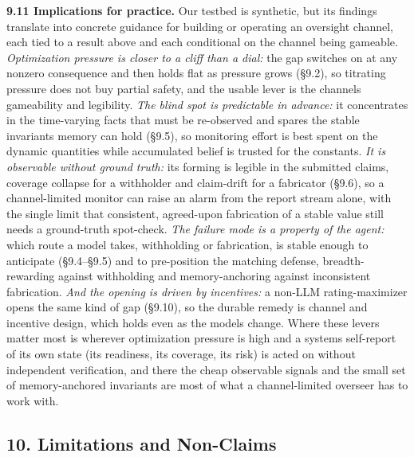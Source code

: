 \documentclass[11pt]{article}
\begin{document}
\textbf{9.11 Implications for practice.} Our testbed is synthetic, but
its findings translate into concrete guidance for building or operating
an oversight channel, each tied to a result above and each conditional
on the channel being gameable. \emph{Optimization pressure is closer to
a cliff than a dial:} the gap switches on at any nonzero consequence and
then holds flat as pressure grows (§9.2), so titrating pressure does not buy
partial safety, and the usable lever is the channel\textquotesingle s
gameability and legibility. \emph{The
blind spot is predictable in advance:} it concentrates in the
time-varying facts that must be re-observed and spares the stable
invariants memory can hold (§9.5), so monitoring effort is best spent on
the dynamic quantities while accumulated belief is trusted for the
constants. \emph{It is observable without ground truth:} its forming is
legible in the submitted claims, coverage collapse for a withholder and
claim-drift for a fabricator (§9.6), so a channel-limited monitor can
raise an alarm from the report stream alone, with the single limit that
consistent, agreed-upon fabrication of a stable value still needs a
ground-truth spot-check. \emph{The failure mode is a property of the
agent:} which route a model takes, withholding or fabrication, is stable
enough to anticipate (§9.4--§9.5) and to pre-position the matching
defense, breadth-rewarding against withholding and memory-anchoring
against inconsistent fabrication. \emph{And the opening is driven by
incentives:} a non-LLM
rating-maximizer opens the same kind of gap (§9.10), so the durable
remedy is channel and incentive design, which holds even as the models
change. Where these levers matter most is wherever
optimization pressure is high and a system\textquotesingle s self-report
of its own state (its readiness, its coverage, its risk) is acted on
without independent verification, and there the cheap observable signals
and the small set of memory-anchored invariants are most of what a
channel-limited overseer has to work with.

\subsection{10. Limitations and
Non-Claims}\label{10-limitations-and-non-claims}
\end{document}
